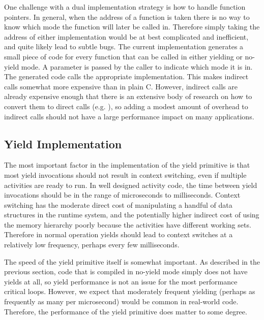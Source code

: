 \documentclass[10pt,preprint]{sigplanconf}
\begin{document}
One challenge with a dual implementation strategy is how to handle function pointers.
In general, when the address of a function is taken there is no way to know which mode the function will later be called in.
Therefore simply taking the address of either implementation would be at best complicated and inefficient, and quite likely lead to subtle bugs.
The current implementation generates a small piece of code for every function that can be called in either yielding or no-yield mode.
A parameter is passed by the caller to indicate which mode it is in.
The generated code calls the appropriate implementation.
This makes indirect calls somewhat more expensive than in plain C.
However, indirect calls are already expensive enough that there is an extensive body of research on how to convert them to direct calls (e.g. \cite{Dean1995}), so adding a modest amount of overhead to indirect calls should not have a large performance impact on many applications.

\subsection{Yield Implementation}

The most important factor in the implementation of the yield primitive is that most yield invocations should not result in context switching, even if multiple activities are ready to run.
In well designed activity code, the time between yield invocations should be in the range of microseconds to milliseconds.
Context switching has the moderate direct cost of manipulating a handful of data structures in the runtime system, and the potentially higher indirect cost of using the memory hierarchy poorly because the activities have different working sets.
Therefore in normal operation yields should lead to context switches at a relatively low frequency, perhaps every few milliseconds.

The speed of the yield primitive itself is somewhat important.
As described in the previous section, code that is compiled in no-yield mode simply does not have yields at all, so yield performance is not an issue for the most performance critical loops.
However, we expect that moderately frequent yielding (perhaps as frequently as many per microsecond) would be common in real-world code.
Therefore, the performance of the yield primitive does matter to some degree.
\end{document}
